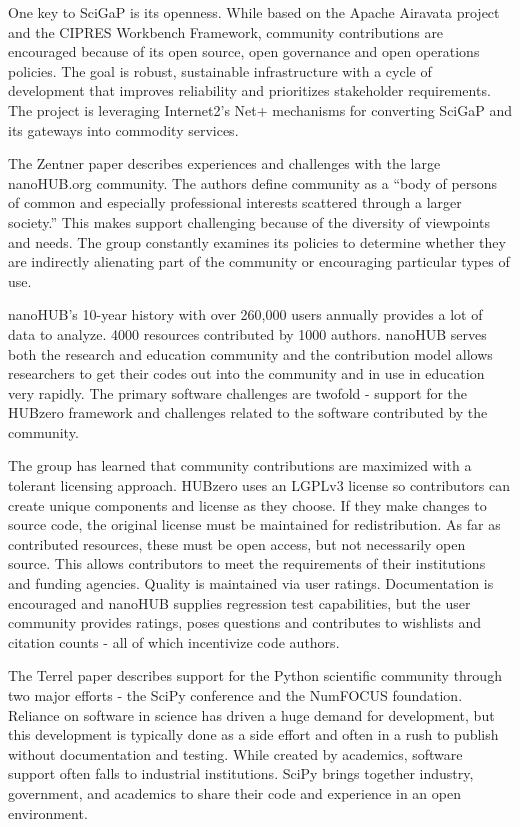 \documentclass[11pt, oneside]{amsart}
\begin{document}
One key to SciGaP is its openness. While based on the Apache Airavata project
and the CIPRES Workbench Framework, community contributions are encouraged
because of its open source, open governance and open operations policies. The
goal is robust, sustainable infrastructure with a cycle of development that
improves reliability and prioritizes stakeholder requirements. The project is
leveraging Internet2's Net+ mechanisms for converting SciGaP and its gateways
into commodity services.

The Zentner paper describes experiences and challenges with the large
nanoHUB.org community. The authors define community as a ``body of persons of
common and especially professional interests scattered through a larger
society.'' This makes support challenging because of the diversity of
viewpoints and needs. The group constantly examines its policies to determine
whether they are indirectly alienating part of the community or encouraging
particular types of use.

nanoHUB's 10-year history with over 260,000 users annually provides a lot of
data to analyze. 4000 resources contributed by 1000 authors. nanoHUB serves
both the research and education community and the contribution model allows
researchers to get their codes out into the community and in use in education
very rapidly. The primary software challenges are twofold - support for the
HUBzero framework and challenges related to the software contributed by the
community.

The group has learned that community contributions are maximized with a
tolerant licensing approach. HUBzero uses an LGPLv3 license so contributors can
create unique components and license as they choose. If they make changes to
source code, the original license must be maintained for redistribution. As far
as contributed resources, these must be open access, but not necessarily open
source. This allows contributors to meet the requirements of their institutions
and funding agencies. Quality is maintained via user ratings. Documentation is
encouraged and nanoHUB supplies regression test capabilities, but the user
community provides ratings, poses questions and contributes to wishlists and
citation counts - all of which incentivize code authors.

The Terrel paper describes support for the Python scientific community through
two major efforts - the SciPy conference and the NumFOCUS foundation. Reliance
on software in science has driven a huge demand for development, but this
development is typically done as a side effort and often in a rush to publish
without documentation and testing. While created by academics, software support
often falls to industrial institutions. SciPy brings together industry,
government, and academics to share their code and experience in an open
environment.
\end{document}
